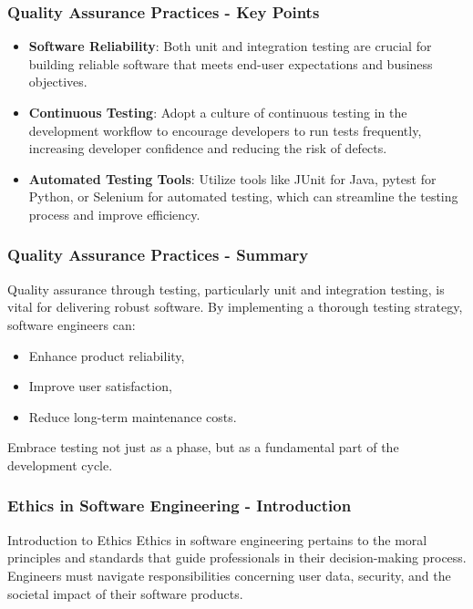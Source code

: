\documentclass{beamer}
\begin{document}
\begin{frame}[fragile]
    \frametitle{Quality Assurance Practices - Key Points}
    \begin{itemize}
        \item \textbf{Software Reliability}: Both unit and integration testing are crucial for building reliable software that meets end-user expectations and business objectives.
        \item \textbf{Continuous Testing}: Adopt a culture of continuous testing in the development workflow to encourage developers to run tests frequently, increasing developer confidence and reducing the risk of defects.
        \item \textbf{Automated Testing Tools}: Utilize tools like JUnit for Java, pytest for Python, or Selenium for automated testing, which can streamline the testing process and improve efficiency.
    \end{itemize}
\end{frame}

\begin{frame}[fragile]
    \frametitle{Quality Assurance Practices - Summary}
    Quality assurance through testing, particularly unit and integration testing, is vital for delivering robust software. By implementing a thorough testing strategy, software engineers can:
    \begin{itemize}
        \item Enhance product reliability,
        \item Improve user satisfaction,
        \item Reduce long-term maintenance costs.
    \end{itemize}
    Embrace testing not just as a phase, but as a fundamental part of the development cycle.
\end{frame}

\begin{frame}[fragile]
    \frametitle{Ethics in Software Engineering - Introduction}
    \begin{block}{Introduction to Ethics}
        Ethics in software engineering pertains to the moral principles and standards that guide professionals in their decision-making process. Engineers must navigate responsibilities concerning user data, security, and the societal impact of their software products.
    \end{block}
\end{frame}
\end{document}
